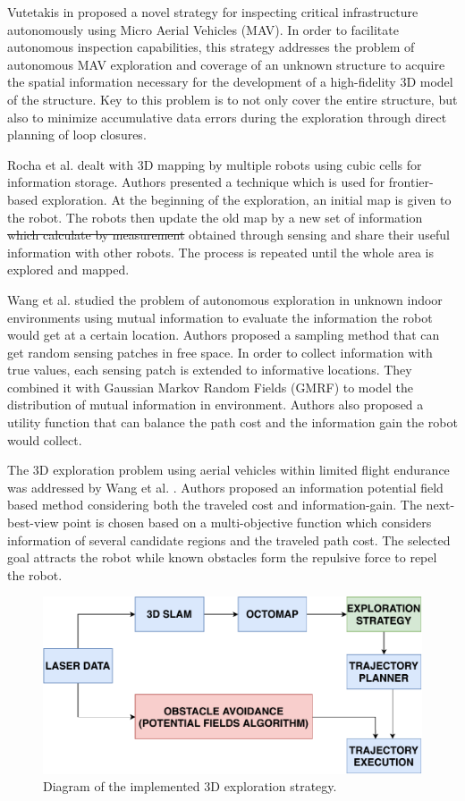 Vutetakis in \cite{Vutetakis2019} proposed a novel strategy for inspecting critical infrastructure autonomously using Micro Aerial Vehicles (MAV). In order to facilitate autonomous inspection capabilities, this strategy addresses the problem of autonomous MAV exploration and coverage of an unknown structure to acquire the spatial information necessary for the development of a high-fidelity 3D model of the structure. Key to this problem is to not only cover the entire structure, but also to minimize accumulative data errors during the exploration through direct planning of loop closures. 

Rocha et al. \cite{Rocha2005} dealt with 3D mapping by multiple robots using cubic cells for information storage. Authors presented a technique which is used for frontier-based exploration. At the beginning of the exploration, an initial map is given to the robot. The robots then update the old map by a new set of information \st{which calculate by measurement} {\color{red}obtained through sensing} and share their useful information with other robots. The process is repeated until the whole area is explored and mapped.

Wang et al. \cite{Wang2018} studied the problem of autonomous exploration in unknown indoor environments using mutual information to evaluate the information the robot would get at a certain location. Authors proposed a
sampling method that can get random sensing patches in free space. In order to collect information with true values, each sensing patch is extended to informative locations. They combined it with Gaussian
Markov Random Fields (GMRF) to model the distribution of mutual information in environment.  Authors also proposed a utility function that can balance the path cost and the information gain the robot would collect.

The 3D exploration problem using aerial vehicles within limited flight endurance was addressed by Wang et al. \cite{Wang2019}. Authors proposed an information potential field based method considering both the traveled cost and information-gain. The next-best-view point is chosen based on a multi-objective function which considers information of several candidate regions and the traveled path cost. The selected goal attracts the robot while known obstacles form the repulsive force to repel the robot.

\begin{figure}[t!]
	\centering
	\includegraphics[width=1.0\columnwidth]{./pictures/3D_strategy.pdf}	
	\caption{Diagram of the implemented 3D exploration strategy.}
	\label{fig:3D_strategy}
\end{figure}



